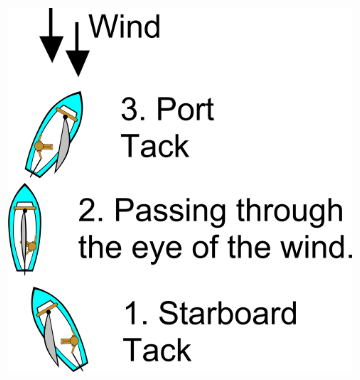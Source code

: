 \documentclass[12pt,twoside]{report}
\begin{document}
\begin{figure}[h]
    \centering
    \begin{subfigure}[b]{0.28\textwidth}
        \centering
        \includegraphics[width=\textwidth]{figures/sailing/tack.png}
        \label{fig:tack}
    \end{subfigure}
    \begin{subfigure}[b]{0.22\textwidth}
        \centering

\end{subfigure}
\end{figure}
\end{document}
